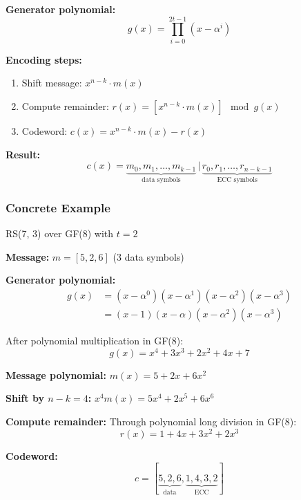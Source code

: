 \documentclass[11pt,a4paper]{article}
\begin{document}
\textbf{Generator polynomial:}
\begin{equation}
g(x) = \prod_{i=0}^{2t-1}(x - \alpha^i)
\end{equation}

\textbf{Encoding steps:}
\begin{enumerate}
    \item Shift message: $x^{n-k} \cdot m(x)$
    \item Compute remainder: $r(x) = [x^{n-k} \cdot m(x)] \mod g(x)$
    \item Codeword: $c(x) = x^{n-k} \cdot m(x) - r(x)$
\end{enumerate}

\textbf{Result:}
\begin{equation}
c(x) = \underbrace{m_0, m_1, \ldots, m_{k-1}}_{\text{data symbols}} \, | \, \underbrace{r_0, r_1, \ldots, r_{n-k-1}}_{\text{ECC symbols}}
\end{equation}

\subsubsection{Concrete Example}

RS(7, 3) over GF(8) with $t=2$

\textbf{Message:} $m = [5, 2, 6]$ (3 data symbols)

\textbf{Generator polynomial:}
\begin{align}
g(x) &= (x - \alpha^0)(x - \alpha^1)(x - \alpha^2)(x - \alpha^3) \\
&= (x - 1)(x - \alpha)(x - \alpha^2)(x - \alpha^3)
\end{align}

After polynomial multiplication in GF(8):
\begin{equation}
g(x) = x^4 + 3x^3 + 2x^2 + 4x + 7
\end{equation}

\textbf{Message polynomial:} $m(x) = 5 + 2x + 6x^2$

\textbf{Shift by $n-k=4$:} $x^4 m(x) = 5x^4 + 2x^5 + 6x^6$

\textbf{Compute remainder:} Through polynomial long division in GF(8):
\begin{equation}
r(x) = 1 + 4x + 3x^2 + 2x^3
\end{equation}

\textbf{Codeword:}
\begin{equation}
c = [\underbrace{5, 2, 6}_{\text{data}}, \underbrace{1, 4, 3, 2}_{\text{ECC}}]
\end{equation}
\end{document}
